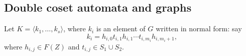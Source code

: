 \documentclass[a4paper,12pt]{article}
\newcommand{\G}{\Gamma }
\newtheorem{exam}[theorem]{Example}
\newenvironment{example}{\begin{exam} \rm}{\end{exam}}
\numberwithin{equation}{section}
\numberwithin{figure}{section}
\newcommand{\la}{\langle}
\newcommand{\ra}{\rangle}
\begin{document}
\subsection{Double coset automata and graphs}
\begin{comment}
An {\em elementary folding} of a graph $\G$ is a graph $\G^\prime$
obtained from $\G$ as follows. Suppose that $e=(p,a,q)$ and
$e^\prime=(p,a,q^\prime)$
are edges of $\G$. (We do not require $p$, $q$ and $q^\prime$ to be distinct.)
 Then $\G^\prime$ is the quotient of $\G$ formed by identifying
$q$ and $q^\prime$, to form a new vertex $q^{\prime\prime}$; and
$e$ and $e^\prime$, to form a new edge
$e^{\prime\prime}=(p,a,q^{\prime\prime})$. If the root of $\G$ is $q$
 or $q^\prime$ then $q^{\prime\prime}$ is the root of $\G^\prime$ and otherwise
 the root of $\G^\prime$ is that of $\G$.
 A {\em folding} of a graph $\G$ is a graph obtained
from $\G$ by a finite sequence of elementary foldings.

A graph on which  it is not possible to perform an elementary
folding is
said to be {\em folded}. A {\em Stallings folding} of a graph $\G$ is
 a (possibly trivial) folding of $\G$ which is folded. As every non-trivial
folding decreases
 the number of edges of the graph, every graph has a Stallings folding.
From the
standard theory (e.g. Enric's notes \cite{ventura11}) a Stallings folding of a graph is unique,
so we may define {\em the Stallings folding} $S(\G)$ of a graph $\G$.


~\\
({\bf This is not quite clear, because it needs to be established
that colouring of a Stallings folding of $\G$ is not dependent on
the order of folding. It would be enough to show that the morphism
from $\G$ to $S(\G)$ is uniquely determined by $\G$, but I haven't
checked this out.}}{\ef It seems to be true, but I didn't check it
out properly yet.})
\begin{example}

Figure \ref{fig:dc-graphb} shows the Stallings folding of the graph of
Example \ref{ex:dc-graph}. Colours are shown only where the folding changes them.
\end{example}
\end{comment}
%
%
Let $K=\la k_1, \ldots , k_s\ra$, where $k_i$ is an element of $G$
written in normal form: say
\begin{equation}\label{eq:k-form}
k_i= h_{i,0}t_{i,1}h_{i,1}\cdots t_{i,m_i}h_{i,m_i+1},
\end{equation}
where $h_{i,j}\in F(Z)$ and $t_{i,j}\in S_1\cup S_2$.
\end{document}
